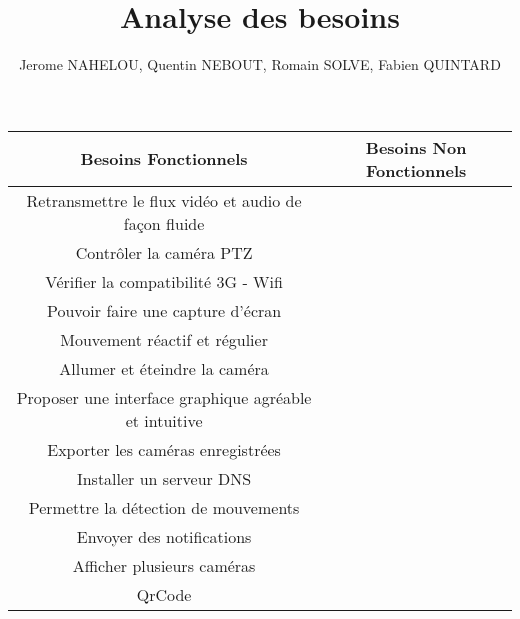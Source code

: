 \documentclass[a4paper,10pt]{report}
\begin{document}
\title{Analyse des besoins}
\author{Jerome NAHELOU, Quentin NEBOUT, Romain SOLVE, Fabien QUINTARD}


 \begin{center}
   \begin{tabular}{|c|c}
    \hline
   Besoins Fonctionnels & Besoins Non Fonctionnels\\
    \hline
    Retransmettre le flux vidéo et audio de façon fluide\\
    Contrôler la caméra PTZ\\
    Vérifier la compatibilité 3G - Wifi\\
    Pouvoir faire une capture d'écran\\
    Mouvement réactif et régulier\\
    Allumer et éteindre la caméra\\
    Proposer une interface graphique agréable et intuitive\\
    Exporter les caméras enregistrées\\
    Installer un serveur DNS\\
    Permettre la détection de mouvements\\
    Envoyer des notifications\\
    Afficher plusieurs caméras\\
    QrCode\\
    \hline
   \end{tabular}
  \end{center}
  
\end{document}
